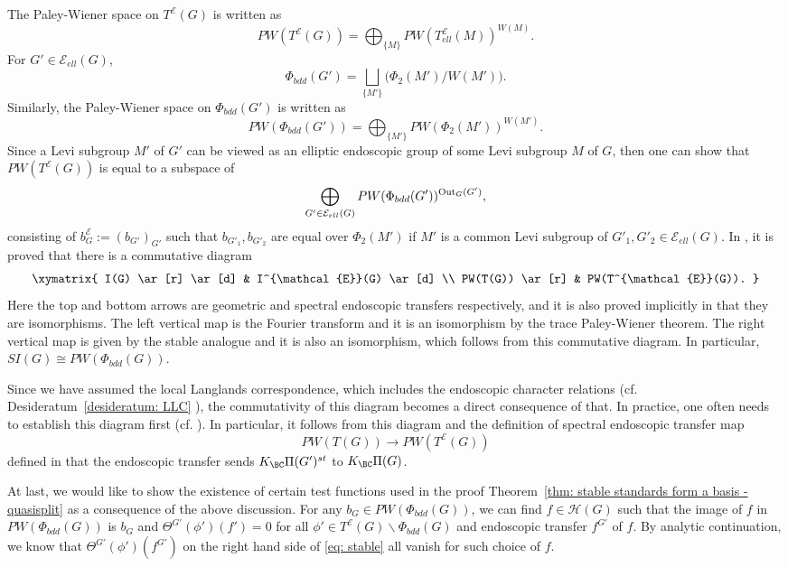 \documentclass[11pt,letterpaper]{amsart}
\numberwithin{equation}{section}
\begin{document}
The Paley-Wiener space on $T^{\mathcal{E}}(G)$ is  written as
\[
PW(T^{\mathcal{E}}(G)) = \bigoplus_{\{M\}} PW(T^{\mathcal{E}}_{ell}(M))^{W(M)}.
\]
For $G' \in \mathcal{E}_{ell}(G)$, 
\[
\Phi_{bdd}(G') = \bigsqcup_{\{M'\}} \Big( \Phi_2(M') / W(M') \Big).
\]
Similarly, the Paley-Wiener space on $\Phi_{bdd}(G')$ is written as
\[
PW(\Phi_{bdd}(G')) = \bigoplus_{\{M'\}} PW(\Phi_2(M'))^{W(M')}.
\]
Since a Levi subgroup $M'$ of $G'$ can be viewed as an elliptic endoscopic group of some Levi subgroup $M$ of $G$, then one can show that $PW(T^{\mathcal{E}}(G))$ is equal to a subspace of
\[
\bigoplus_{G' \in \mathcal{E}_{ell}(G)} PW(\Phi_{bdd}(G'))^{{\rm Out}_{G}(G')},
\]
consisting of $b^{\mathcal{E}}_{G} := (b_{G'})_{G'}$ such that $b_{G'_1}, b_{G'_2}$ are equal over $\Phi_{2}(M')$ if $M'$ is a common Levi subgroup of $G'_1, G'_2 \in \mathcal{E}_{ell}(G)$. In \cite{Art96}, it is proved that there is a commutative diagram
\begin{align}
\label{diag: transfer}
\xymatrix{
I(G) \ar[r] \ar[d] & I^{\mathcal{E}}(G) \ar[d] \\
PW(T(G)) \ar[r] & PW(T^{\mathcal{E}}(G)).
}
\end{align}
Here the top and bottom arrows are geometric and spectral endoscopic transfers respectively, and it is also proved implicitly in \cite{Art96} that they are isomorphisms. The left vertical map is the Fourier transform and it is an isomorphism by the trace Paley-Wiener theorem. The right vertical map is given by the stable analogue and it is also an isomorphism, which  follows from this commutative diagram. In particular, $SI(G) \cong PW(\Phi_{bdd}(G))$. 

\begin{remark}
Since we have assumed the local Langlands correspondence, which includes the endoscopic character relations (cf. Desideratum~\ref{desideratum: LLC} \ECR), the commutativity of this diagram becomes a direct consequence of that. In practice, one often needs to establish this diagram first (cf. \cite{Art13}). In particular, it follows from this diagram and the definition of spectral endoscopic transfer map
\[
PW(T(G)) \rightarrow PW(T^{\mathcal{E}}(G))
\]
defined in \cite{Art96} that the endoscopic transfer sends $K_\BC\Pi(G')^{st}$ to $K_{\BC} \Pi(G)$.
\end{remark}

At last, we would like to show the existence of certain test functions used in the proof Theorem~\ref{thm: stable standards form a basis - quasisplit} as a consequence of the above discussion. For any $b_{G} \in PW(\Phi_{bdd}(G))$, we can find $f \in \mathcal{H}(G)$ such that the image of $f$ in $PW(\Phi_{bdd}(G))$ is $b_{G}$ and $\Theta^{G'}(\phi')(f') = 0$ for all $\phi' \in T^{\mathcal{E}}(G) \backslash \Phi_{bdd}(G)$ and endoscopic transfer $f^{G'}$ of $f$. By analytic continuation, we know that $\Theta^{G'}(\phi')(f^{G'})$ on the right hand side of \eqref{eq: stable} all vanish for such choice of $f$. 
\end{document}
